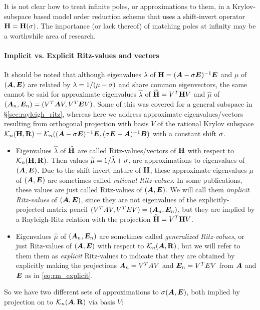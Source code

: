   It is not clear how to treat infinite poles, or approximations to them, in a Krylov-subspace based model order reduction scheme that uses a shift-invert operator $\textbf{\textup{H}}=\textbf{\textup{H}}(\sigma)$.  The importance (or lack thereof) of matching poles at infinity may be a worthwhile area of research. 

\paragraph{Implicit vs. Explicit Ritz-values and vectors}
It should be noted that although eigenvalues $\lambda$ of $\textbf{\textup{H}} = (\bm{A} - \sigma \bm{E})^{-1}\bm{E}$ and $\mu$ of $(\bm{A},\bm{E})$ are related by $\lambda = 1 /(\mu-\sigma)$ and share common eigenvectors, the same cannot be said for approximate eigenvalues $\hat{\lambda}$ of $\widetilde{\textbf{\textup{H}}}=V^T \textbf{\textup{H}} V$ and $\hat{\mu}$ of $(\bm{A}_n, \bm{E}_n) = (V^T\bm{A} V, V^T \bm{E} V)$.   Some of this was covered for a general subspace in \S\ref{sec:rayleigh_ritz}, whereas here we address approximate eigenvalues/vectors resulting from orthogonal projection with basis $V$ of the rational Krylov subspace $\mathcal{K}_{n}({\textbf{\textup{H}}},{\textbf{\textup{R}}}) = \mathcal{K}_{n}({ (\bm{A} - \sigma \bm{E})^{-1}\bm{E}},{ (\sigma \bm{E}-\bm{A})^{-1}\bm{B}})$ with a constant shift $\sigma$.
\begin{itemize}
\item Eigenvalues $\hat{\lambda}$ of $\widetilde{\textbf{\textup{H}}}$ are called Ritz-values/vectors of $\textbf{\textup{H}}$ with respect to $\mathcal{K}_{n}({\textbf{\textup{H}}},{\textbf{\textup{R}}})$.  Then values $\widetilde{\mu} =1/\hat{\lambda}+\sigma$, are approximations to eigenvalues of $(\bm{A},\bm{E})$.  Due to the shift-invert nature of $\textbf{\textup{H}}$, these approximate eigenvalues $\widetilde{\mu}$ of $(\bm{A},\bm{E})$ are sometimes called \emph{rational Ritz-values}.   In some publications, these values are just called Ritz-values of $(\bm{A},\bm{E})$.  We will call them \emph{implicit Ritz-values} of $(\bm{A},\bm{E})$, since they are not eigenvalues of the explicitly-projected matrix pencil $(V^T A V, V^T E V)=(\bm{A}_n,\bm{E}_n)$, but they are implied by a Rayleigh-Ritz relation with the projection $\widetilde{\textbf{\textup{H}}} = V^T \textbf{\textup{H}} V$.
\item Eigenvalues $\hat{\mu}$ of $(\bm{A}_n, \bm{E}_n)$ are sometimes called \emph{generalized Ritz-values}, or just Ritz-values of $(\bm{A},\bm{E})$ with respect to $\mathcal{K}_{n}({\bm{A}},{\textbf{\textup{R}}})$, but we will refer to them them as \emph{explicit} Ritz-values to indicate that they are obtained by explicitly making the projections $\bm{A}_n=V^T A V$ and $\bm{E}_n=V^T E V$ from $\bm{A}$ and $\bm{E}$ as in \eqref{eq:rm_explicit}.
\end{itemize}
So we have two different sets of approximations to $\sigma(\bm{A},\bm{E})$, both implied by projection on to $\mathcal{K}_{n}({\bm{A}},{\textbf{\textup{R}}})$ via basis $V$:
